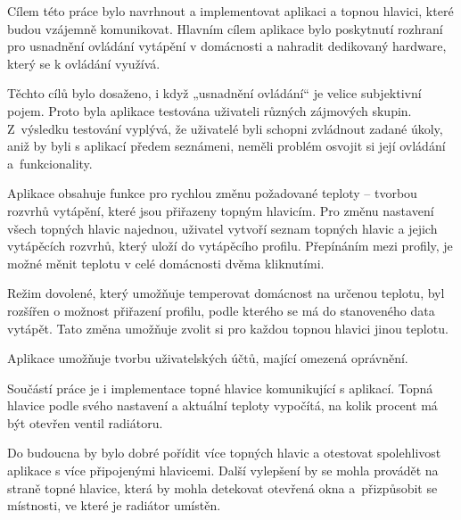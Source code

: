 \documentclass[thesis=B,czech]{FITthesis}[2012/10/20]
\begin{document}
\begin{conclusion}
Cílem této práce bylo navrhnout a implementovat aplikaci a topnou hlavici, které budou vzájemně komunikovat. Hlavním cílem aplikace bylo poskytnutí rozhraní pro usnadnění ovládání vytápění v domácnosti a nahradit dedikovaný hardware, který se k ovládání využívá.

Těchto cílů bylo dosaženo, i když „usnadnění ovládání“ je velice subjektivní pojem. Proto byla aplikace testována uživateli různých zájmových skupin. Z~výsledku testování vyplývá, že uživatelé byli schopni zvládnout zadané úkoly, aniž by byli s aplikací předem seznámeni, neměli problém osvojit si její ovládání a~funkcionality.

Aplikace obsahuje funkce pro rychlou změnu požadované teploty -- tvorbou rozvrhů vytápění, které jsou přiřazeny topným hlavicím. Pro změnu nastavení všech topných hlavic najednou, uživatel vytvoří seznam topných hlavic a jejich vytápěcích rozvrhů, který uloží do vytápěcího profilu. Přepínáním mezi profily, je možné měnit teplotu v celé domácnosti dvěma kliknutími.

Režim dovolené, který umožňuje temperovat domácnost na určenou teplotu, byl rozšířen o možnost přiřazení profilu, podle kterého se má do stanoveného data vytápět. Tato změna umožňuje zvolit si pro každou topnou hlavici jinou teplotu.

Aplikace umožňuje tvorbu uživatelských účtů, mající omezená oprávnění.

Součástí práce je i implementace topné hlavice komunikující s aplikací. Topná hlavice podle svého nastavení a aktuální teploty vypočítá, na kolik procent má být otevřen ventil radiátoru.

Do budoucna by bylo dobré pořídit více topných hlavic a otestovat spolehlivost aplikace s více připojenými hlavicemi. Další vylepšení by se mohla provádět na straně topné hlavice, která by mohla detekovat otevřená okna a~přizpůsobit se místnosti, ve které je radiátor umístěn. 

	
\end{conclusion}




\appendix
\end{document}
